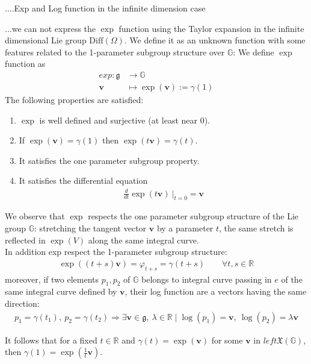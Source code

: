 ....Exp and Log function in the infinite dimension case

...we can not express the $\exp$ function using the Taylor expansion in the infinite dimensional Lie group $\text{Diff}(\Omega)$. We define it as an unknown function with some features related to the 1-parameter subgroup structure over $\mathbb{G}$:
We define $\exp$ function as
\begin{align*}
exp : \mathfrak{g} & \longrightarrow  \mathbb{G}   \\
\mathbf{v} &\longmapsto \exp(\mathbf{v}):= \gamma(1)
\end{align*}
The following properties are satisfied:
\begin{enumerate}
	\item $\exp$ is well defined and surjective (at least near 0).
	\item If $\exp(\mathbf{v}) = \gamma(1)$ then $\exp(t\mathbf{v}) = \gamma(t)$.
	\item It satisfies the one parameter subgroup property.
	\item It satisfies the differential equation
	\begin{align*}
	\frac{d}{dt} \exp(t\mathbf{v})~\Bigr|_{t=0} = \mathbf{v}
	\end{align*}
\end{enumerate}

We observe that $\exp$ respects the one parameter subgroup structure of the Lie group $\mathbb{G}$: stretching the tangent vector $\mathbf{v}$ by a parameter $t$, the same stretch is reflected in $\exp(V)$ along the same integral curve.\\ 
In addition exp respect the 1-parameter subgroup structure:
\begin{align*}
\exp((t+s)\mathbf{v}) = \varphi_{t+s} = \gamma(t+s) \qquad \forall t,s \in \mathbb{R}
\end{align*}
moreover, if two elements $p_1 , p_2$ of $\mathbb{G}$ belongs to integral curve passing in $e$ of the same integral curve defined by $\mathbf{v}$, their log function are a vectors having the same direction:
\begin{align*}
p_1 = \gamma(t_1), ~ p_2 = \gamma(t_2) \Rightarrow \exists \mathbf{v} \in \mathfrak{g}, ~ \lambda \in \mathbb{R}\mid \log(p_1) = \mathbf{v} , ~ \log(p_2) = \lambda \mathbf{v}
\end{align*}

It follows that for a fixed $t \in \mathbb{R}$ and $\gamma(t) = \exp(\mathbf{v} )$ for some $\mathbf{v} $ in $left\mathfrak{X}(\mathbb{G})$, then $\gamma(1) = \exp(\frac{1}{t}\mathbf{v})$.

